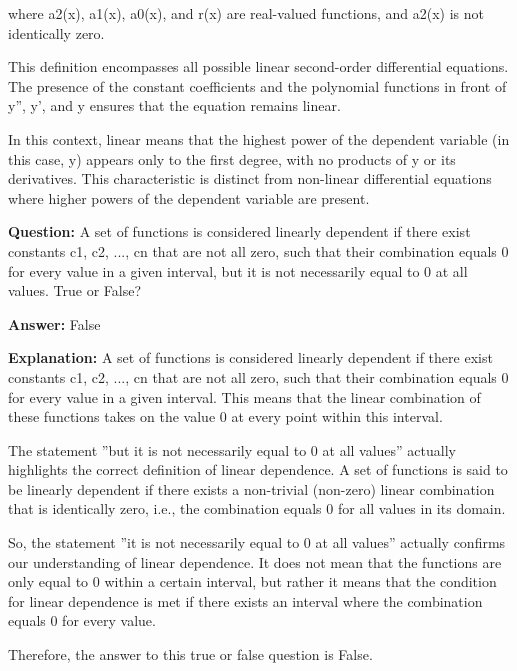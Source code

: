 \documentclass{article}
\begin{document}
where a2(x), a1(x), a0(x), and r(x) are real-valued functions, and a2(x) is not identically zero.

This definition encompasses all possible linear second-order differential equations. The presence of the constant coefficients and the polynomial functions in front of y'', y', and y ensures that the equation remains linear.

In this context, linear means that the highest power of the dependent variable (in this case, y) appears only to the first degree, with no products of y or its derivatives. This characteristic is distinct from non-linear differential equations where higher powers of the dependent variable are present.
                
                \vspace{0.5cm} 
        
            
                \textbf {Question:} A set of functions is considered linearly dependent if there exist constants c1, c2, ..., cn that are not all zero, such that their combination equals 0 for every value in a given interval, but it is not necessarily equal to 0 at all values. True or False?
                
                \textbf{Answer:} False

                \textbf{Explanation:} A set of functions is considered linearly dependent if there exist constants c1, c2, ..., cn that are not all zero, such that their combination equals 0 for every value in a given interval. This means that the linear combination of these functions takes on the value 0 at every point within this interval.

The statement ''but it is not necessarily equal to 0 at all values'' actually highlights the correct definition of linear dependence. A set of functions is said to be linearly dependent if there exists a non-trivial (non-zero) linear combination that is identically zero, i.e., the combination equals 0 for all values in its domain.

So, the statement ''it is not necessarily equal to 0 at all values'' actually confirms our understanding of linear dependence. It does not mean that the functions are only equal to 0 within a certain interval, but rather it means that the condition for linear dependence is met if there exists an interval where the combination equals 0 for every value.

Therefore, the answer to this true or false question is False.
                
\end{document}
